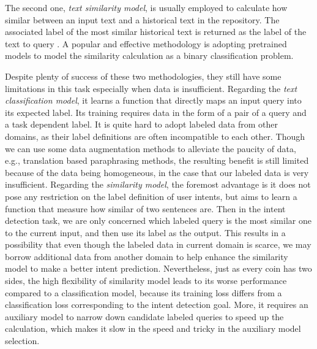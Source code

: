 The second one, \emph{text similarity model}, is usually employed to calculate how similar between an input text and a historical text in the repository. 
The associated label of the most similar historical text is returned as the label of the text to query \cite{jafarpour2010filter, leuski2011npceditor}. 
A popular and effective methodology is adopting pretrained models to model the similarity calculation as a binary classification problem.

Despite plenty of success of these two methodologies, they still have some limitations in this task especially when data is insufficient.
Regarding the \emph{text classification model}, it learns a function that directly maps an input query into its expected label.
Its training requires data in the form of a pair of a query and a task dependent label. 
It is quite hard to adopt labeled data from other domains, as their label definitions are often incompatible to each other. 
Though we can use some data augmentation methods to alleviate the paucity of data, e.g., translation based paraphrasing methods, the resulting benefit is still limited because of the data being homogeneous, in the case that our labeled data is very insufficient.
Regarding the \emph{similarity model}, the foremost advantage is it does not pose any restriction on the label definition of user intents, but aims to learn a function that measure how similar of two sentences are. 
Then in the intent detection task, we are only concerned which labeled query is the most similar one to the current input, and then use its label as the output.
This results in a possibility that even though the labeled data in current domain is scarce, we may borrow additional data from another domain to help enhance the similarity model to make a better intent prediction.
Nevertheless, just as every coin has two sides, the high flexibility of similarity model leads to its worse performance compared to a classification model, because its training loss differs from a classification loss corresponding to the intent detection goal.
More, it requires an auxiliary model to narrow down candidate labeled queries to speed up the calculation, which makes it slow in the speed and tricky in the auxiliary model selection. 

